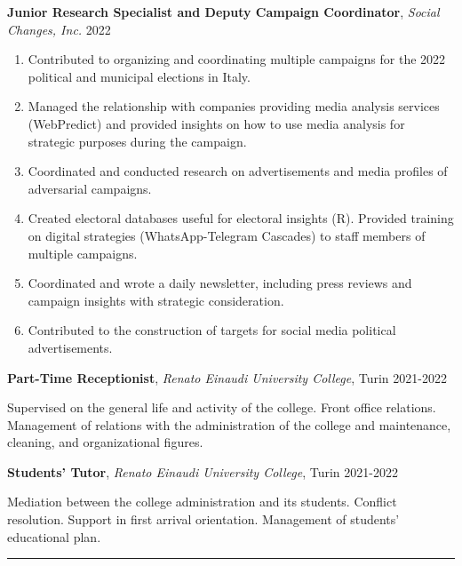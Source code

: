 \documentclass[10pt,]{article}
\providecommand{\tightlist}{%
  \setlength{\itemsep}{0pt}\setlength{\parskip}{0pt}}
\renewenvironment{itemize}{
  \begin{list}{}{
    \setlength{\leftmargin}{1.5em}
  }
}{
  \end{list}
}
\begin{document}
\begin{itemize}
\item
  \textbf{Junior Research Specialist and Deputy Campaign Coordinator},
  \emph{Social Changes, Inc.} \hfill 2022

  \begin{enumerate}
  \def\labelenumi{\alph{enumi})}
  \tightlist
  \item
    Contributed to organizing and coordinating multiple campaigns for
    the 2022 political and municipal elections in Italy.
  \item
    Managed the relationship with companies providing media analysis
    services (WebPredict) and provided insights on how to use media
    analysis for strategic purposes during the campaign.
  \item
    Coordinated and conducted research on advertisements and media
    profiles of adversarial campaigns.
  \item
    Created electoral databases useful for electoral insights (R).
    Provided training on digital strategies (WhatsApp-Telegram Cascades)
    to staff members of multiple campaigns.
  \item
    Coordinated and wrote a daily newsletter, including press reviews
    and campaign insights with strategic consideration.
  \item
    Contributed to the construction of targets for social media
    political advertisements.
  \end{enumerate}
\item
  \textbf{Part-Time Receptionist}, \emph{Renato Einaudi University
  College}, Turin \hfill 2021-2022

  \begin{itemize}
  \tightlist
  \item
    Supervised on the general life and activity of the college. Front
    office relations. Management of relations with the administration of
    the college and maintenance, cleaning, and organizational figures.
  \end{itemize}
\item
  \textbf{Students' Tutor}, \emph{Renato Einaudi University College},
  Turin \hfill 2021-2022

  \begin{itemize}
  \item
    Mediation between the college administration and its students.
    Conflict resolution. Support in first arrival orientation.
    Management of students' educational plan.

    \bigskip \hrule
  \end{itemize}
\end{itemize}
\end{document}
